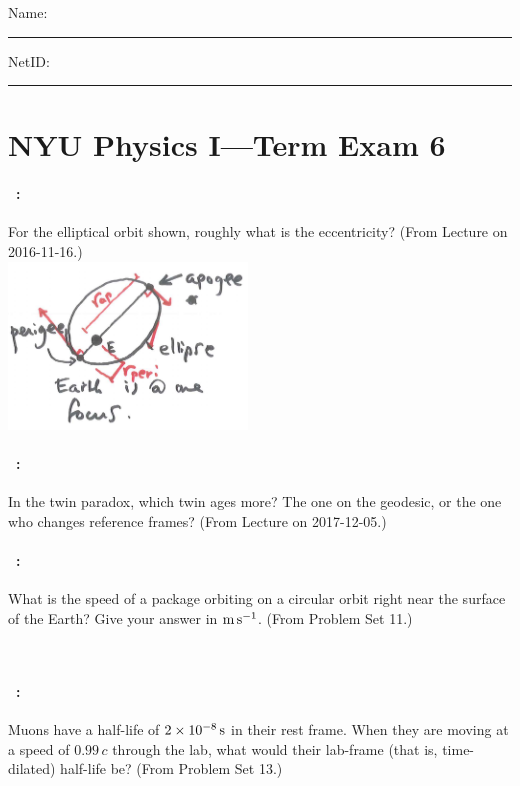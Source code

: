 \documentclass[12pt]{article} 
\begin{document}
\noindent
Name: \rule[-1ex]{0.55\textwidth}{0.1pt}
NetID: \rule[-1ex]{0.2\textwidth}{0.1pt}

\section*{NYU Physics I---Term Exam 6}

\paragraph{\problemname~\theproblem:}%
For the elliptical orbit shown, roughly what is the eccentricity?
(From Lecture on 2016-11-16.)\\
\includegraphics[width=2.5in]{./ellipse.png}

\vfill

\paragraph{\problemname~\theproblem:}%
In the twin paradox, which twin ages more? The one on the geodesic, or
the one who changes reference frames? (From Lecture on 2017-12-05.)

\vfill

\paragraph{\problemname~\theproblem:}%
What is the speed of a package orbiting on a circular orbit right near
the surface of the Earth? Give your answer in $\mathrm{m}\,\mathrm{s}^{-1}$. (From Problem Set 11.)

\vfill
~
\clearpage

\paragraph{\problemname~\theproblem:}%
Muons have a half-life of $2\times 10^{-8}\,\mathrm{s}$ in their rest
frame. When they are moving at a speed of $0.99\,c$ through the
lab, what would their lab-frame (that is, time-dilated) half-life be?
(From Problem Set 13.)
\end{document}
